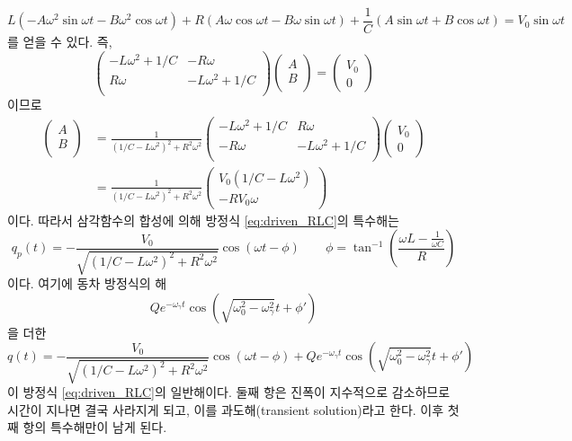 \begin{equation}
L(-A\omega^2\sin\omega t - B\omega^2 \cos\omega t)+R(A\omega \cos\omega t - B\omega \sin\omega t)+\frac{1}{C}(A\sin\omega t+B\cos\omega t)=V_0\sin\omega t
\end{equation}
를 얻을 수 있다. 즉,
\begin{equation}
\begin{pmatrix}
-L\omega^2+1/C  & -R\omega\\
R\omega &-L\omega^2+1/C\\
\end{pmatrix}
\begin{pmatrix}
A\\
B\\
\end{pmatrix}
=\begin{pmatrix}
V_0\\
0
\end{pmatrix}
\end{equation}
이므로
\begin{align}
\begin{pmatrix}
A\\
B\\
\end{pmatrix}
&=
\frac{1}{(1/C-L\omega^2)^2+R^2\omega^2}
\begin{pmatrix}
-L\omega^2+1/C  & R\omega\\
-R\omega &-L\omega^2+1/C\\
\end{pmatrix}
\begin{pmatrix}
V_0\\
0
\end{pmatrix}\\
&=
\frac{1}{(1/C-L\omega^2)^2+R^2\omega^2}
\begin{pmatrix}
V_0(1/C-L\omega^2)\\
-RV_0\omega
\end{pmatrix}
\end{align}
이다. 따라서 삼각함수의 합성에 의해 방정식 \ref{eq:driven_RLC}의 특수해는
\begin{equation}
q_p(t)=-\frac{V_0}{\sqrt{(1/C-L\omega^2)^2+R^2\omega^2}}\cos(\omega t-\phi)\quad\quad \phi = \tan^{-1}(\frac{\omega L-\frac{1}{\omega C}}{R})
\end{equation}
이다. 여기에 동차 방정식의 해
\begin{equation}
 Qe^{-\omega_\gamma t}\cos(\sqrt{\omega_0^2-\omega_\gamma^2}t+\phi')
\end{equation}
을 더한
\begin{equation}
q(t)=-\frac{V_0}{\sqrt{(1/C-L\omega^2)^2+R^2\omega^2}}\cos(\omega t-\phi)+ Qe^{-\omega_\gamma t}\cos(\sqrt{\omega_0^2-\omega_\gamma^2}t+\phi')
\end{equation}
이 방정식 \ref{eq:driven_RLC}의 일반해이다. 둘째 항은 진폭이 지수적으로 감소하므로 시간이 지나면 결국 사라지게 되고, 이를 과도해(transient solution)라고 한다. 이후 첫째 항의 특수해만이 남게 된다.

